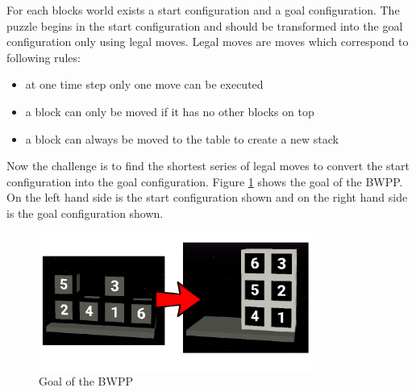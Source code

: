 \documentclass[runningheads]{llncs}
\begin{document}
        For each blocks world exists a start configuration and a goal configuration.
        The puzzle begins in the start configuration and should be transformed into the goal configuration only using legal moves.
        Legal moves are moves which correspond to following rules:
        \begin{itemize}
            \item at one time step only one move can be executed 
            \item a block can only be moved if it has no other blocks on top
            \item a block can always be moved to the table to create a new stack
        \end{itemize}
        Now the challenge is to find the shortest series of legal moves to convert the start configuration into the goal configuration.\newline
        Figure \ref{goalOfTheBWPP} shows the goal of the BWPP.
        On the left hand side is the start configuration shown and on the right hand side is the goal configuration shown.
        \begin{figure}
            \centering
            \includegraphics[width=9cm]{start_goal_config.png}
            \caption{Goal of the BWPP}
            \label{goalOfTheBWPP}
        \end{figure}
\end{document}
